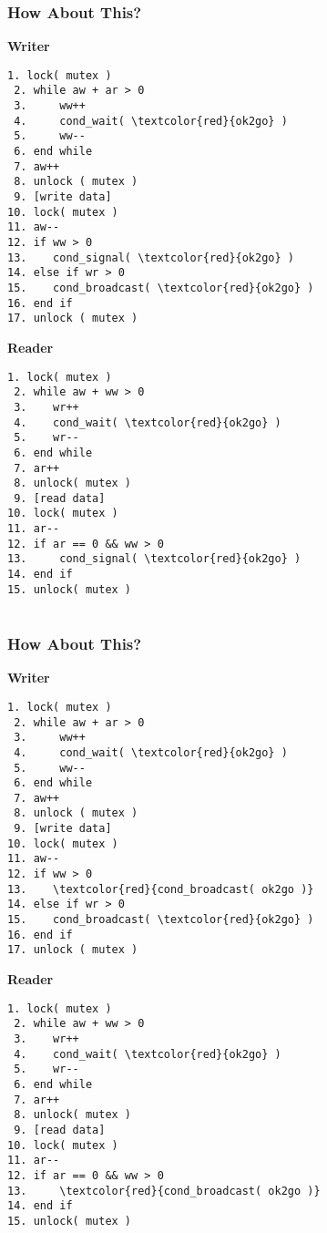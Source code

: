 \begin{frame}[fragile]
	\frametitle{How About This?}

	\begin{multicols}{2}
		\small
		\textbf{Writer}
		\begin{Verbatim}[commandchars=\\\{\}]
 1. lock( mutex )
 2. while aw + ar > 0
 3.     ww++
 4.     cond_wait( \textcolor{red}{ok2go} )
 5.     ww--
 6. end while
 7. aw++
 8. unlock ( mutex )
 9. [write data]
10. lock( mutex )
11. aw--
12. if ww > 0
13.    cond_signal( \textcolor{red}{ok2go} )
14. else if wr > 0
15.    cond_broadcast( \textcolor{red}{ok2go} )
16. end if
17. unlock ( mutex )
		\end{Verbatim}
		\columnbreak
		\textbf{Reader}
		\begin{Verbatim}[commandchars=\\\{\}]
 1. lock( mutex )
 2. while aw + ww > 0
 3.    wr++
 4.    cond_wait( \textcolor{red}{ok2go} )
 5.    wr--
 6. end while
 7. ar++
 8. unlock( mutex )
 9. [read data]
10. lock( mutex )
11. ar--
12. if ar == 0 && ww > 0
13.     cond_signal( \textcolor{red}{ok2go} )
14. end if
15. unlock( mutex )


		\end{Verbatim}
	\end{multicols}
	\vspace{-2em}
\end{frame}


\begin{frame}[fragile]
	\frametitle{How About This?}

	\begin{multicols}{2}
		\small
		\textbf{Writer}
		\begin{Verbatim}[commandchars=\\\{\}]
 1. lock( mutex )
 2. while aw + ar > 0
 3.     ww++
 4.     cond_wait( \textcolor{red}{ok2go} )
 5.     ww--
 6. end while
 7. aw++
 8. unlock ( mutex )
 9. [write data]
10. lock( mutex )
11. aw--
12. if ww > 0
13.    \textcolor{red}{cond_broadcast( ok2go )}
14. else if wr > 0
15.    cond_broadcast( \textcolor{red}{ok2go} )
16. end if
17. unlock ( mutex )
		\end{Verbatim}
		\columnbreak
		\textbf{Reader}
		\begin{Verbatim}[commandchars=\\\{\}]
 1. lock( mutex )
 2. while aw + ww > 0
 3.    wr++
 4.    cond_wait( \textcolor{red}{ok2go} )
 5.    wr--
 6. end while
 7. ar++
 8. unlock( mutex )
 9. [read data]
10. lock( mutex )
11. ar--
12. if ar == 0 && ww > 0
13.     \textcolor{red}{cond_broadcast( ok2go )}
14. end if
15. unlock( mutex )


		\end{Verbatim}
	\end{multicols}
	\vspace{-2em}
\end{frame}


